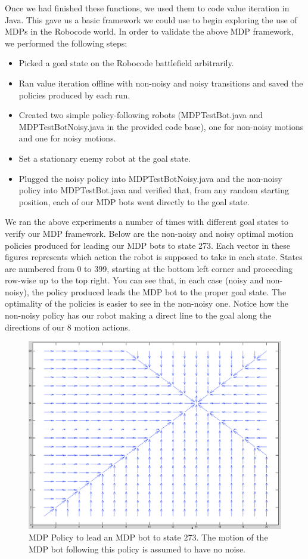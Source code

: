 \documentclass{aiaa-tc}%
\begin{document}
Once we had finished these functions, we used them to code value iteration in Java. This gave us a basic framework we could use to begin exploring the use of MDPs in the Robocode world. In order to validate the above MDP framework, we performed the following steps:
\begin{itemize}
\item Picked a goal state on the Robocode battlefield arbitrarily.
\item Ran value iteration offline with non-noisy and noisy transitions and saved the policies produced by each run.
\item Created two simple policy-following robots (MDPTestBot.java and MDPTestBotNoisy.java in the provided code base), one for non-noisy motions and one for noisy motions.
\item Set a stationary enemy robot at the goal state.
\item Plugged the noisy policy into MDPTestBotNoisy.java and the non-noisy policy into MDPTestBot.java and verified that, from any random starting position, each of our MDP bots went directly to the goal state. 
\end{itemize}
We ran the above experiments a number of times with different goal states to verify our MDP framework. Below are the non-noisy and noisy optimal motion policies produced for leading our MDP bots to state 273. Each vector in these figures represents which action the robot is supposed to take in each state. States are numbered from 0 to 399, starting at the bottom left corner and proceeding row-wise up to the top right. You can see that, in each case (noisy and non-noisy), the policy produced leads the MDP bot to the proper goal state. The optimality of the policies is easier to see in the non-noisy one. Notice how the non-noisy policy has our robot making a direct line to the goal along the directions of our 8 motion actions.  
\begin{figure}[htbp]
   \centering
   \includegraphics[width=170mm]{mdp_policy_to_state_273.png} 
   \caption{MDP Policy to lead an MDP bot to state 273. The motion of the MDP bot following this policy is assumed to have no noise.}
   \label{fig:sample}
\end{figure}
\end{document}
